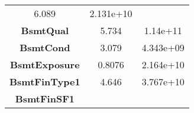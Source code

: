 \documentclass[]{article}
\begin{document}
\begin{longtable}[c]{@{}ccc@{}}
\begin{minipage}[t]{0.16\columnwidth}\centering\strut
6.089
\strut\end{minipage} &
\begin{minipage}[t]{0.19\columnwidth}\centering\strut
2.131e+10
\strut\end{minipage}\tabularnewline
\begin{minipage}[t]{0.25\columnwidth}\centering\strut
\textbf{BsmtQual}
\strut\end{minipage} &
\begin{minipage}[t]{0.16\columnwidth}\centering\strut
5.734
\strut\end{minipage} &
\begin{minipage}[t]{0.19\columnwidth}\centering\strut
1.14e+11
\strut\end{minipage}\tabularnewline
\begin{minipage}[t]{0.25\columnwidth}\centering\strut
\textbf{BsmtCond}
\strut\end{minipage} &
\begin{minipage}[t]{0.16\columnwidth}\centering\strut
3.079
\strut\end{minipage} &
\begin{minipage}[t]{0.19\columnwidth}\centering\strut
4.343e+09
\strut\end{minipage}\tabularnewline
\begin{minipage}[t]{0.25\columnwidth}\centering\strut
\textbf{BsmtExposure}
\strut\end{minipage} &
\begin{minipage}[t]{0.16\columnwidth}\centering\strut
0.8076
\strut\end{minipage} &
\begin{minipage}[t]{0.19\columnwidth}\centering\strut
2.164e+10
\strut\end{minipage}\tabularnewline
\begin{minipage}[t]{0.25\columnwidth}\centering\strut
\textbf{BsmtFinType1}
\strut\end{minipage} &
\begin{minipage}[t]{0.16\columnwidth}\centering\strut
4.646
\strut\end{minipage} &
\begin{minipage}[t]{0.19\columnwidth}\centering\strut
3.767e+10
\strut\end{minipage}\tabularnewline
\begin{minipage}[t]{0.25\columnwidth}\centering\strut
\textbf{BsmtFinSF1}
\strut\end{minipage} &

\end{longtable}
\end{document}
